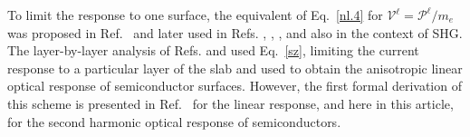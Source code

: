 To limit the response to one surface, the equivalent of Eq.~\eqref{nl.4} 
for $\boldsymbol{\mathcal{V}}^\ell=\boldsymbol{\mathcal{P}}^\ell/m_{e}$ was proposed in 
Ref.~\cite{reiningPRB94} and later used in Refs.
\cite{mendozaPRL98},
\cite{mendozaPRB01},
\cite{sanoPRB02},
 and \cite{mejiaRMF04} 
also in the context of SHG. 
The layer-by-layer analysis of Refs. \cite{hoganPRB03} 
and \cite{castilloPRB03} used Eq.~\eqref{sz}, 
limiting the current response
to a particular layer of the slab and used to obtain the
anisotropic linear optical response of semiconductor surfaces.
However, the first formal derivation of this scheme is presented in
Ref.~\cite{mendozaPRB06} for the linear response, and here in this 
article, for the second harmonic optical response of semiconductors.




